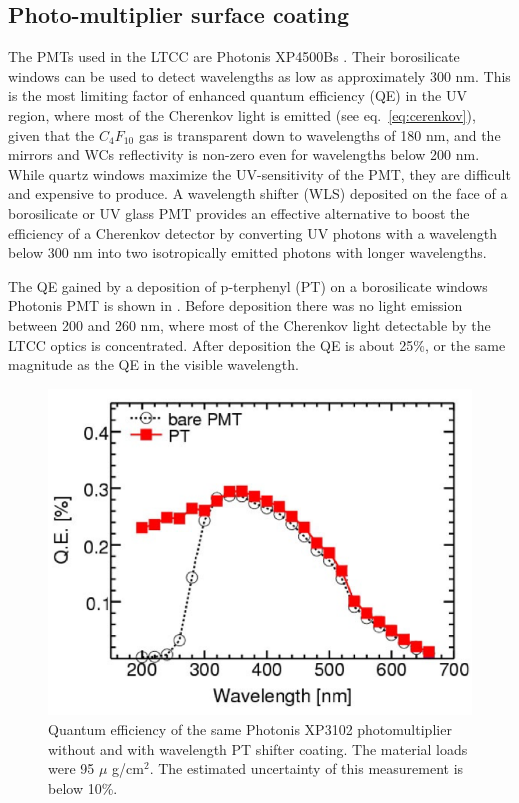 \subsection{Photo-multiplier surface coating}

The PMTs used in the LTCC are Photonis XP4500Bs \cite{Photonis:2007ta}.
Their borosilicate windows can be used to detect wavelengths as low as approximately
300 nm. This is the most limiting factor of enhanced quantum efficiency (QE) in the UV region, where most of the Cherenkov
light is emitted (see eq.~\ref{eq:cerenkov}), given that the $C_4F_{10}$ gas is transparent down to
wavelengths of 180 nm, and the mirrors and WCs reflectivity is non-zero
even for wavelengths below 200 nm.
While quartz windows maximize the UV-sensitivity of the PMT, they are difficult and expensive to produce.
A wavelength shifter (WLS) deposited on the face of a borosilicate or UV glass
PMT provides an effective alternative to boost the efficiency of a Cherenkov
detector by converting UV photons with a wavelength below 300 nm into two
isotropically emitted photons with longer wavelengths.

The QE gained by a deposition of p-terphenyl (PT) on a borosilicate windows
Photonis PMT \cite{Koczon:1457653} is shown in .
Before deposition there was no light emission between 200 and 260 nm, where most of the Cherenkov light
detectable by the LTCC optics is concentrated. After deposition the QE is about 25$\%$, or the
same magnitude as the QE in the visible wavelength.


\begin{figure}
	\centering
	\includegraphics[width=0.95\columnwidth,keepaspectratio]{img/pmtQuantumEfficiencyGain.png}
	\caption{Quantum efficiency of the same Photonis XP3102 photomultiplier without and with
            wavelength PT shifter coating. The material loads were 95 $\mu$ g/cm$^2$.
            The estimated uncertainty of this measurement is below 10\%. }
	\label{fig:pmtQuantumEfficiencyGain}
\end{figure}


